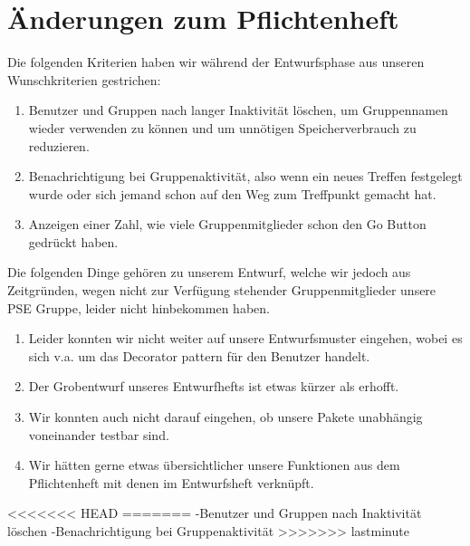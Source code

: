 \section{Änderungen zum Pflichtenheft}

Die folgenden Kriterien haben wir während der Entwurfsphase aus unseren Wunschkriterien gestrichen:\\
\begin{enumerate}
	\item Benutzer und Gruppen nach langer Inaktivität löschen, um Gruppennamen wieder verwenden zu können und um unnötigen Speicherverbrauch zu reduzieren.
	\item Benachrichtigung bei Gruppenaktivität, also wenn ein neues Treffen festgelegt wurde oder sich jemand schon auf den Weg zum Treffpunkt gemacht hat.
	\item Anzeigen einer Zahl, wie viele Gruppenmitglieder schon den Go Button gedrückt haben.
\end{enumerate}

Die folgenden Dinge gehören zu unserem Entwurf, welche wir jedoch aus Zeitgründen, wegen nicht zur Verfügung stehender Gruppenmitglieder unsere PSE Gruppe, leider nicht hinbekommen haben.
\begin{enumerate}
	\item Leider konnten wir nicht weiter auf unsere Entwurfsmuster eingehen, wobei es sich v.a. um das Decorator pattern für den Benutzer handelt.
	\item Der Grobentwurf unseres Entwurfhefts ist etwas kürzer als erhofft.
	\item Wir konnten auch nicht darauf eingehen, ob unsere Pakete unabhängig voneinander testbar sind.
	\item Wir hätten gerne etwas übersichtlicher unsere Funktionen aus dem Pflichtenheft mit denen im Entwurfsheft verknüpft.
\end{enumerate}

<<<<<<< HEAD
=======
-Benutzer und Gruppen nach Inaktivität löschen
-Benachrichtigung bei Gruppenaktivität
>>>>>>> lastminute
